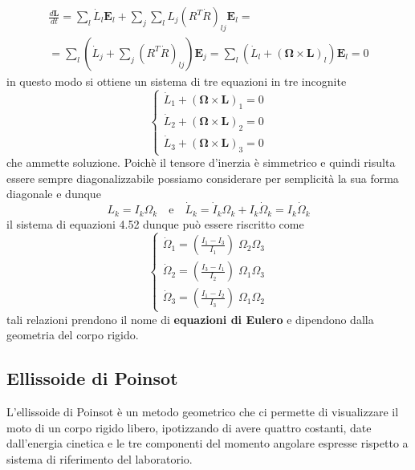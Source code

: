 \begin{equation}
	\begin{aligned}
		& \frac{d \bm{L}}{dt} = \sum_{l} \dot{L}_{l}\bm{E}_{l} + \sum_{j}\sum_{l} L_{j} \left (R^T \dot{R} \right )_{lj} \bm{E}_{l} = & \\[0.1in]
		& = \sum_{l} \left ( \dot{L}_{j} + \sum_{j}\left (R^T \dot{R} \right )_{lj} \right ) \bm{E}_{j} = \sum_{l} \left ( \dot{L}_{l} + \left ( \bm{\Omega} \times \bm{L} \right )_{l} \right )\bm{E}_{l} = 0
	\end{aligned}
\end{equation}
in questo modo si ottiene un sistema di tre equazioni in tre incognite 
\begin{equation}
	\left \{ \begin{array}{l}
		\dot{L}_{1} + \left ( \bm{\Omega} \times \bm{L} \right )_{1} = 0 \\[0.1in]
		\dot{L}_{2} + \left ( \bm{\Omega} \times \bm{L} \right )_{2} = 0\\[0.1in]
		\dot{L}_{3} + \left ( \bm{\Omega} \times \bm{L} \right )_{3} = 0
	\end{array} \right.
\end{equation}
che ammette soluzione. Poich\`{e} il tensore d'inerzia \`{e} simmetrico e quindi risulta essere sempre diagonalizzabile possiamo considerare per semplicit\`{a} la sua forma diagonale e dunque
\begin{equation}
	L_{k} = I_k \Omega_k \quad \text{e} \quad \dot{L}_{k} = \dot{I}_{k} \Omega_{k}  + I_k \dot{\Omega}_k = I_k \dot{\Omega}_k
\end{equation}
il sistema di equazioni 4.52 dunque pu\`{o} essere riscritto come 
\begin{equation}
	\left \{ \begin{array}{l}
		\dot{\Omega}_{1} = \left ( \frac{I_1 - I_3}{I_1} \right ) \;\Omega_2 \Omega_3  \\[0.1in]
		\dot{\Omega}_{2} = \left ( \frac{I_3 - I_1}{I_2} \right ) \;\Omega_1 \Omega_3 \\[0.1in]
		\dot{\Omega}_{3} = \left ( \frac{I_1 - I_2}{I_3} \right ) \;\Omega_1 \Omega_2
	\end{array} \right.
\end{equation}
tali relazioni prendono il nome di \textbf{equazioni di Eulero}  e dipendono dalla geometria del corpo rigido.	
\subsection{Ellissoide di Poinsot}
L'ellissoide di Poinsot \`{e} un metodo geometrico che ci permette di visualizzare il moto di un corpo rigido libero, ipotizzando di avere quattro costanti, date dall'energia cinetica e le tre componenti del momento angolare espresse rispetto a sistema di riferimento del laboratorio.
\newline

